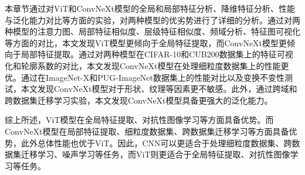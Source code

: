 本章节通过对ViT和ConvNeXt模型的全局和局部特征分析、降维特征分析、性能与泛化能力对比等方面的实验，对两种模型的优劣势进行了详细的分析。通过对两种模型的注意力图、局部特征相似度、层级特征相似度、频域分析、特征图可视化等方面的对比，本文发现ViT模型更倾向于全局特征提取，而ConvNeXt模型更倾向于局部特征提取。通过对两种模型在CIFAR-10和CUB200数据集上的特征可视化和轮廓系数的对比，本文发现ConvNeXt模型在处理细粒度数据集上的性能更优。通过在ImageNet-X和PUG-ImageNet数据集上的性能对比以及变换不变性测试，本文发现ConvNeXt模型对于形状、纹理等因素更不敏感。此外，通过跨域和跨数据集迁移学习实验，本文发现ConvNeXt模型具备更强大的泛化能力。

综上所述，ViT模型在全局特征提取、对抗性图像学习等方面具备优势。而ConvNeXt模型在局部特征提取、细粒度数据集、跨数据集迁移学习等方面具备优势，此外总体性能也优于ViT。因此，CNN可以更适合于处理细粒度数据集、跨数据集迁移学习、噪声学习等任务，而ViT则更适合于全局特征提取、对抗性图像学习等任务。